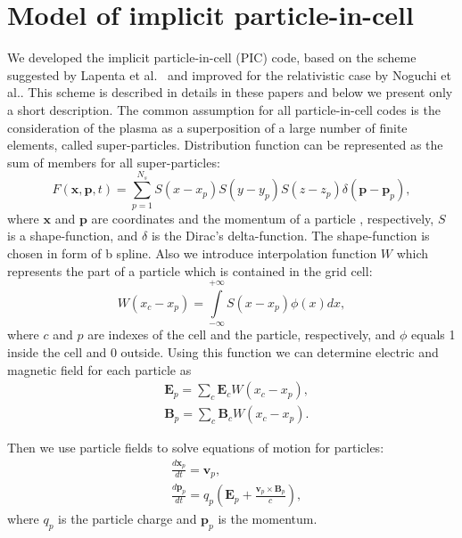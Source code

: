 \section{Model of implicit particle-in-cell}
We developed the implicit particle-in-cell (PIC) code, based on the scheme suggested by Lapenta et al.~\cite{Lapenta2006} and improved for the relativistic case by Noguchi et al.\cite{Noguchi2007}. This scheme is described in details in these papers and below we present only a short description. The common assumption for all particle-in-cell codes is the consideration of the plasma as a superposition of a large number of finite elements, called super-particles. Distribution function can be represented as the sum of members for all super-particles: 
\begin{equation}
F \left( \textbf{x},\textbf{p},t \right) =\sum _{p=1}^{N_{s}}S \left( x-x_{{p}} \right) 
S \left( y-y_{{p}} \right) S \left( z-z_{{p}} \right) \delta \left( \textbf{p}-\textbf{p}_{{p}} \right), 
\end{equation}
where $\textbf{x}$ and $\textbf{p}$ are coordinates and the momentum of a particle , respectively, $S$ is a shape-function, and $\delta$ is the Dirac's delta-function. The shape-function is chosen in form of b spline. Also we introduce interpolation function $W$ which represents the part of a particle which is contained in the grid cell:
\begin{equation}
W \left(x_{{c}} - x_{{p}} \right)= \int\limits_{-\infty}^{+\infty}S(x-x_{{p}})\phi(x)dx,
\end{equation} 
where $c$ and $p$ are indexes of the cell and the particle, respectively, and $\phi$ equals 1 inside the cell and 0 outside. Using this function we can determine electric and magnetic field for each particle as
\begin{equation}
\begin{aligned}
&\textbf{E}_{p} = \sum_{c}\textbf{E}_c W \left(x_{{c}} - x_{{p}} \right),
\\
&\textbf{B}_{p} = \sum_{c}\textbf{B}_c W \left(x_{{c}} - x_{{p}} \right).
\end{aligned}
\end{equation}

Then we use particle fields to solve equations of motion for particles:
\begin{equation}
\begin{aligned}
&{\frac {d\textbf{x}_p}{dt}}=\textbf{v}_p,
\\
&{\frac {d\textbf{p}_p}{dt}}=q_p \left(\textbf{E}_{p}+\frac{\textbf{v}_p\times\textbf{B}_{p}}{c}\right),
\end{aligned}
\end{equation}
where $q_p$ is the particle charge and $\textbf{p}_p$ is the momentum.

